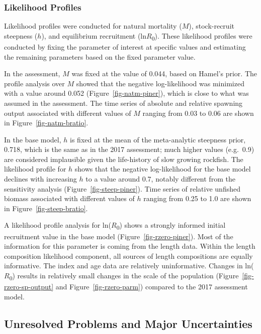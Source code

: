 \documentclass[
]{scrartcl}
\begin{document}
\subsubsection{Likelihood Profiles}\label{likelihood-profiles}

Likelihood profiles were conducted for natural mortality (\(M\)),
stock-recruit steepness (\(h\)), and equilibrium recruitment
(ln\(R\)\textsubscript{0}). These likelihood profiles were conducted by
fixing the parameter of interest at specific values and estimating the
remaining parameters based on the fixed parameter value.

In the assessment, \(M\) was fixed at the value of 0.044, based on
Hamel's prior. The profile analysis over \(M\) showed that the negative
log-likelihood was minimized with a value around 0.052
(Figure~\ref{fig-natm-piner}), which is close to what was assumed in the
assessment. The time series of absolute and relative spawning output
associated with different values of \(M\) ranging from 0.03 to 0.06 are
shown in Figure~\ref{fig-natm-bratio}.

In the base model, \(h\) is fixed at the mean of the meta-analytic
steepness prior, 0.718, which is the same as in the 2017 assessment;
much higher values (e.g.~0.9) are considered implausible given the
life-history of slow growing rockfish. The likelihood profile for \(h\)
shows that the negative log-likelihood for the base model declines with
increasing \(h\) to a value around 0.7, notably different from the
sensitivity analysis (Figure~\ref{fig-steep-piner}). Time series of
relative unfished biomass associated with different values of \(h\)
ranging from 0.25 to 1.0 are shown in Figure~\ref{fig-steep-bratio}.

A likelihood profile analysis for ln(\(R\)\textsubscript{0}) shows a
strongly informed initial recruitment value in the base model
(Figure~\ref{fig-rzero-piner}). Most of the information for this
parameter is coming from the length data. Within the length composition
likelihood component, all sources of length compositions are equally
informative. The index and age data are relatively uninformative.
Changes in ln(\(R\)\textsubscript{0}) results in relatively small
changes in the scale of the population (Figure~\ref{fig-rzero-sp-output}
and Figure~\ref{fig-rzero-parm}) compared to the 2017 assessment model.

\subsection{Unresolved Problems and Major
Uncertainties}\label{unresolved-problems-and-major-uncertainties}
\end{document}
